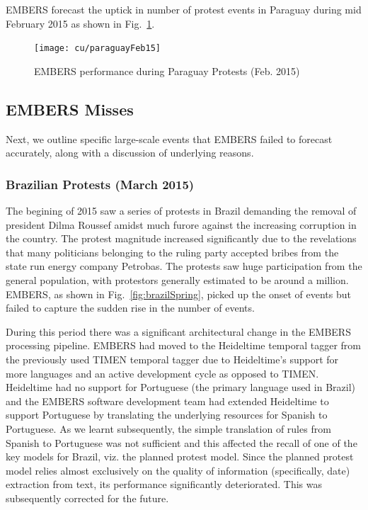 EMBERS forecast the uptick in number of protest events in Paraguay during mid
February 2015 as shown in Fig.~\ref{fig:paraguay15}.

\begin{figure}[H]
\centering
\texttt{[image: cu/paraguayFeb15]}
\caption{EMBERS performance during Paraguay Protests (Feb. 2015)}
\label{fig:paraguay15}
\end{figure}

\subsection{EMBERS Misses}
Next, we outline specific large-scale events that
EMBERS failed to forecast accurately, along with a discussion of underlying
reasons.

\subsubsection{Brazilian Protests (March 2015)}
The begining of 2015 saw a series of protests in Brazil demanding the 
removal of president Dilma Roussef amidst much furore against the increasing corruption in the country.
The protest magnitude increased significantly due to the revelations that many politicians belonging
to the ruling party accepted bribes from the state run energy company Petrobas. The protests saw huge participation from 
the general population, with protestors generally estimated to be around a million. EMBERS, as shown in Fig.~\ref{fig:brazilSpring},
picked up the onset of events but failed to capture the sudden rise in the number of events.

During this period there was a significant architectural change in the
EMBERS processing pipeline. EMBERS had moved to the Heideltime temporal
tagger from the previously used TIMEN temporal tagger due to
Heideltime's support for more languages and an active development cycle as
opposed to TIMEN. 
Heideltime had no support for Portuguese (the primary
language used in Brazil) and the EMBERS software development team had extended Heideltime to
support Portuguese by translating the underlying
resources for Spanish to Portuguese. As we learnt subsequently,
the simple translation of rules from Spanish to Portuguese
was not sufficient and this affected the recall of one of the key models
for Brazil, viz. the planned protest model. Since the planned protest model relies
almost exclusively on the quality of information (specifically, date) extraction from text,
its performance significantly deteriorated. This was subsequently corrected for the future.

